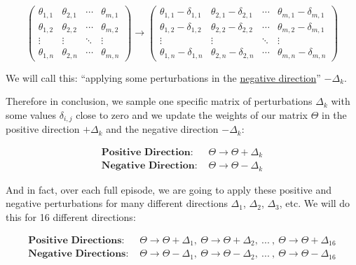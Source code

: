 \documentclass[]{book}
\begin{document}
\begin{equation*}
\begin{pmatrix}
\theta_{1,1} & \theta_{2,1} & \cdots & \theta_{m,1} \\
\theta_{1,2} & \theta_{2,2} & \cdots & \theta_{m,2} \\
\vdots & \vdots & \ddots & \vdots \\
\theta_{1,n} & \theta_{2,n} & \cdots & \theta_{m,n}
\end{pmatrix}
\longrightarrow
\begin{pmatrix}
\theta_{1,1} - \delta_{1,1} & \theta_{2,1} - \delta_{2,1} & \cdots & \theta_{m,1} - \delta_{m,1} \\
\theta_{1,2} - \delta_{1,2} & \theta_{2,2} - \delta_{2,2} & \cdots & \theta_{m,2} - \delta_{m,1} \\
\vdots & \vdots & \ddots & \vdots \\
\theta_{1,n} - \delta_{1,n} & \theta_{2,n} - \delta_{2,n} & \cdots & \theta_{m,n} - \delta_{m,n}
\end{pmatrix}
\end{equation*}

We will call this: ``applying some perturbations in the \underline{negative direction}'' \(-\Delta_k\).

Therefore in conclusion, we sample one specific matrix of perturbations \(\Delta_k\) with some values \(\delta_{i,j}\) close to zero and we update the weights of our matrix \(\Theta\) in the positive direction \(+ \Delta_k\) and the negative direction \(- \Delta_k\):

\begin{align*}
\textbf{Positive Direction: } & \Theta \rightarrow \Theta + \Delta_k \\
\textbf{Negative Direction: } & \Theta \rightarrow \Theta - \Delta_k
\end{align*}

And in fact, over each full episode, we are going to apply these positive and negative perturbations for many different directions \(\Delta_1\), \(\Delta_2\), \(\Delta_3\), etc. We will do this for 16 different directions:

\begin{align*}
\textbf{Positive Directions: } & \Theta \rightarrow \Theta + \Delta_1, \ \Theta \rightarrow \Theta + \Delta_2, \ ... \ , \ \Theta \rightarrow \Theta + \Delta_{16} \\
\textbf{Negative Directions: } & \Theta \rightarrow \Theta - \Delta_1, \ \Theta \rightarrow \Theta - \Delta_2, \ ... \ , \ \Theta \rightarrow \Theta - \Delta_{16}
\end{align*}
\end{document}
